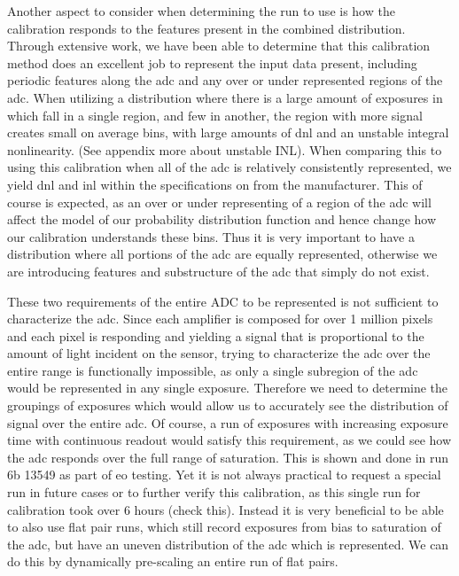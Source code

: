 \documentclass[11pt, letterpaper]{article}
\begin{document}
Another aspect to consider when determining the run to use is how the calibration responds to the features present in the combined distribution. Through extensive work, we have been able to determine that this calibration method does an excellent job to represent the input data present, including periodic features along the adc and any over or under represented regions of the adc. When utilizing a distribution where there is a large amount of exposures in which fall in a single region, and few in another, the region with more signal creates small on average bins, with large amounts of dnl and an unstable integral nonlinearity. (See appendix more about unstable INL). When comparing this to using this calibration when all of the adc is relatively consistently represented, we yield dnl and inl within the specifications on from the manufacturer. This of course is expected, as an over or under representing of a region of the adc will affect the model of our probability distribution function and hence change how our calibration understands these bins. Thus it is very important to have a distribution where all portions of the adc are equally represented, otherwise we are introducing features and substructure of the adc that simply do not exist. 

These two requirements of the entire ADC to be represented is not sufficient to characterize the adc. Since each amplifier is composed for over 1 million pixels and each pixel is responding and yielding a signal that is proportional to the amount of light incident on the sensor, trying to characterize the adc over the entire range is functionally impossible, as only a single subregion of the adc would be represented in any single exposure. Therefore we need to determine the groupings of exposures which would allow us to accurately see the distribution of signal over the entire adc. Of course, a run of exposures with increasing exposure time with continuous readout would satisfy this requirement, as we could see how the adc responds over the full range of saturation. This is shown and done in run 6b 13549 as part of eo testing. Yet it is not always practical to request a special run in future cases or to further verify this calibration, as this single run for calibration took over 6 hours (check this). Instead it is very beneficial to be able to also use flat pair runs, which still record exposures from bias to saturation of the adc, but have an uneven distribution of the adc which is represented. We can do this by dynamically pre-scaling an entire run of flat pairs. 
\end{document}
